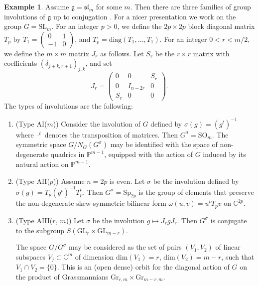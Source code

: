 \documentclass{amsart}
\theoremstyle{definition}
\newtheorem{exa}[thm]{Example}
\begin{document}
\begin{exa}
\label{exa_invol_sl}
Assume $\mathfrak{g}=\mathfrak{sl}_m$ for some $m$. 
Then there are three families of group involutions of $\mathfrak{g}$
up to conjugation \cite[Sections 11.3.4 and 11.3.5]{GW09}. 
For a nicer presentation we work on the group 
$G=\mathrm{SL}_m$.  
For an integer $p>0$, we define the $2p\times 2p$ block diagonal matrix 
$T_p$ by $T_1=(\begin{smallmatrix} 0&1\\-1&0 \end{smallmatrix})$, and  $T_p=\mathrm{diag}(T_1,\ldots, T_1)$.
For an integer $0<r<m/2$, we define the $m\times m$ matrix $J_r$ as follows.
Let $S_r$ be the $r\times r$ matrix with coefficients $(\delta_{j+k,r+1})_{j,k}$, 
and set 
\[
J_r=\begin{pmatrix}
0 & 0 & S_r \\
0 & I_{n-2r} & 0 \\
S_r & 0 & 0
\end{pmatrix}.
\]
The types of involutions are the following:
\begin{enumerate}
\item (Type AI($m$))
Consider the involution of $G$ 
defined by $\sigma(g)=(g^t)^{-1}$ where $\cdot^t$ denotes the transposition
of matrices. Then 
$G^{\sigma}=\mathrm{SO}_m$. 
The symmetric space $G/N_G(G^{\sigma})$ may be identified with the space of 
non-degenerate quadrics in $\mathbb{P}^{m-1}$, equipped with the action 
of $G$ induced by its natural action on $\mathbb{P}^{m-1}$.

\item  (Type AII($p$))
Assume $n=2p$ is even. 
Let $\sigma$ be the involution defined by 
$\sigma(g)=T_p(g^t)^{-1}T_p^t$. Then $G^{\sigma}= \mathrm{Sp}_{2p}$ 
is the 
group of elements that preserve the non-degenerate skew-symmetric bilinear
form $\omega(u,v)=u^tT_pv$ on $\mathbb{C}^{2p}$.

\item (Type AIII($r$, $m$))
Let $\sigma$ be the involution $g\mapsto J_rgJ_r$.
Then $G^{\sigma}$ is conjugate to the subgroup 
$S(\mathrm{GL}_r\times \mathrm{GL}_{m-r})$.

The space $G/G^{\sigma}$ may be considered as the set of pairs $(V_1,V_2)$
of linear subspaces $V_j\subset \mathbb{C}^m$ of dimension $\mathrm{dim}(V_1)=r$,
$\mathrm{dim}(V_2)=m-r$, such that $V_1\cap V_2=\{0\}$. This is an (open dense) orbit 
for the diagonal action of $G$ on the product of Grassmannians 
$\mathrm{Gr}_{r,m}\times \mathrm{Gr}_{m-r,m}$. 
\end{enumerate}
\end{exa}
\end{document}
